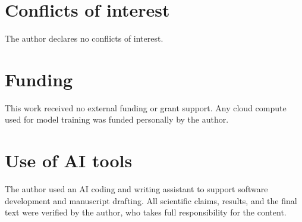 \documentclass[11pt]{article}
\begin{document}
\section*{Conflicts of interest}
The author declares no conflicts of interest.

\section*{Funding}
This work received no external funding or grant support. Any cloud compute used
for model training was funded personally by the author.

\section*{Use of AI tools}
The author used an AI coding and writing assistant to support software
development and manuscript drafting. All scientific claims, results, and the
final text were verified by the author, who takes full responsibility for the
content.



\end{document}
